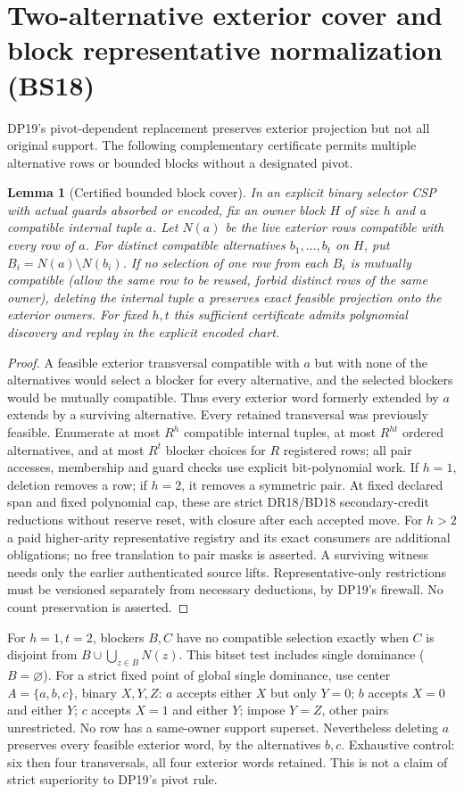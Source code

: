 \documentclass[11pt]{article}
\newtheorem{lemma}[theorem]{Lemma}
\begin{document}
\section{Two-alternative exterior cover and block representative normalization (BS18)}\label{sec:bs18}
DP19's pivot-dependent replacement preserves exterior projection but not all original support. The following complementary certificate permits multiple alternative rows or bounded blocks without a designated pivot.
\begin{lemma}[Certified bounded block cover]\label{lem:bs18-block}
In an explicit binary selector CSP with actual guards absorbed or encoded, fix an owner block $H$ of size $h$ and a compatible internal tuple $a$. Let $N(a)$ be the live exterior rows compatible with every row of $a$. For distinct compatible alternatives $b_1,\ldots,b_t$ on $H$, put $B_i=N(a)\setminus N(b_i)$. If no selection of one row from each $B_i$ is mutually compatible (allow the same row to be reused, forbid distinct rows of the same owner), deleting the internal tuple $a$ preserves exact feasible projection onto the exterior owners. For fixed $h,t$ this sufficient certificate admits polynomial discovery and replay in the explicit encoded chart.
\end{lemma}
\begin{proof}
A feasible exterior transversal compatible with $a$ but with none of the alternatives would select a blocker for every alternative, and the selected blockers would be mutually compatible. Thus every exterior word formerly extended by $a$ extends by a surviving alternative. Every retained transversal was previously feasible. Enumerate at most $R^h$ compatible internal tuples, at most $R^{ht}$ ordered alternatives, and at most $R^t$ blocker choices for $R$ registered rows; all pair accesses, membership and guard checks use explicit bit-polynomial work. If $h=1$, deletion removes a row; if $h=2$, it removes a symmetric pair. At fixed declared span and fixed polynomial cap, these are strict DR18/BD18 secondary-credit reductions without reserve reset, with closure after each accepted move. For $h>2$ a paid higher-arity representative registry and its exact consumers are additional obligations; no free translation to pair masks is asserted. A surviving witness needs only the earlier authenticated source lifts. Representative-only restrictions must be versioned separately from necessary deductions, by DP19's firewall. No count preservation is asserted.
\end{proof}
For $h=1,t=2$, blockers $B,C$ have no compatible selection exactly when $C$ is disjoint from $B\cup\bigcup_{z\in B}N(z)$. This bitset test includes single dominance ($B=\varnothing$). For a strict fixed point of global single dominance, use center $A=\{a,b,c\}$, binary $X,Y,Z$: $a$ accepts either $X$ but only $Y=0$; $b$ accepts $X=0$ and either $Y$; $c$ accepts $X=1$ and either $Y$; impose $Y=Z$, other pairs unrestricted. No row has a same-owner support superset. Nevertheless deleting $a$ preserves every feasible exterior word, by the alternatives $b,c$. Exhaustive control: six then four transversals, all four exterior words retained. This is not a claim of strict superiority to DP19's pivot rule.
\end{document}
